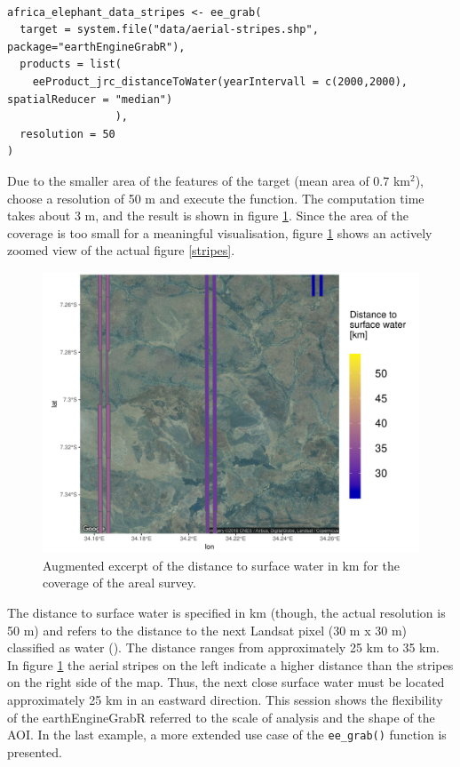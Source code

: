 \begin{lstlisting}

africa_elephant_data_stripes <- ee_grab(
  target = system.file("data/aerial-stripes.shp", package="earthEngineGrabR"), 
  products = list(
    eeProduct_jrc_distanceToWater(yearIntervall = c(2000,2000), spatialReducer = "median")
                 ),
  resolution = 50
)
\end{lstlisting}


Due to the smaller area of the features of the target (mean area of 0.7 km$^2$), choose a resolution of 50 m and execute the function. The computation time takes about 3 m, and the result is shown in figure \ref{session_2}. Since the area of the coverage is too small for a meaningful visualisation, figure \ref{session_2} shows an actively zoomed view of the actual figure \ref{stripes}. 

\begin{center}
	\begin{figure}[h]
		\begin{center}
			\includegraphics[width=15cm]{images/stripes_distance_2.pdf}
			\caption{Augmented excerpt of the distance to surface water in km for the coverage of the areal survey.}
			\label{session_2}
		\end{center}
	\end{figure}
\end{center}

The distance to surface water is specified in km (though, the actual resolution is 50 m) and refers to the distance to the next Landsat pixel (30 m x 30 m) classified as water (\cite{pekel2016high}). The distance ranges from approximately 25 km to 35 km. In figure \ref{session_2} the aerial stripes on the left indicate a higher distance than the stripes on the right side of the map. Thus, the next close surface water must be located approximately 25 km in an eastward direction. 
This session shows the flexibility of the earthEngineGrabR referred to the scale of analysis and the shape of the AOI.
In the last example, a more extended use case of the \texttt{ee\_grab()} function is presented.

